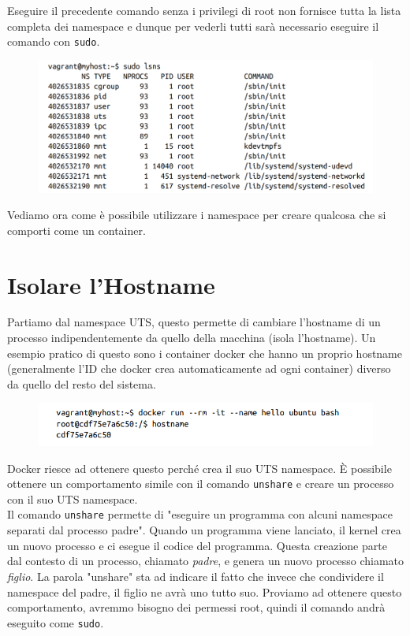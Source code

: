 Eseguire il precedente comando senza i privilegi di root non fornisce tutta la lista
completa dei namespace e dunque per vederli tutti sarà necessario eseguire il comando
con \verb|sudo|.

\begin{figure}[H]
    \centering
    \includegraphics[width=\textwidth, keepaspectratio]{capitoli/os_security/imgs/namespace2.png}
\end{figure}

Vediamo ora come è possibile utilizzare i namespace per creare qualcosa che si
comporti come un container.

\section{Isolare l'Hostname}

Partiamo dal namespace UTS, questo permette di cambiare l'hostname di un processo
indipendentemente da quello della macchina (isola l'hostname).
Un esempio pratico di questo sono i container docker che hanno un proprio hostname
(generalmente l'ID che docker crea automaticamente ad ogni container) diverso da
quello del resto del sistema.

\begin{figure}[H]
    \centering
    \includegraphics[width=\textwidth, keepaspectratio]{capitoli/os_security/imgs/hostname1.png}
\end{figure}

Docker riesce ad ottenere questo perché crea il suo UTS namespace.
È possibile ottenere un comportamento simile con il comando \verb|unshare| e creare
un processo con il suo UTS namespace.\\

Il comando \verb|unshare| permette di "eseguire un programma con alcuni namespace
separati dal processo padre". Quando un programma viene lanciato, il kernel crea un
nuovo processo e ci esegue il codice del programma. Questa creazione parte dal
contesto di un processo, chiamato \textit{padre}, e
genera un nuovo processo chiamato \textit{figlio}. La parola "unshare" sta ad indicare
il fatto che invece che condividere il namespace del padre, il figlio ne avrà uno tutto suo.
Proviamo ad ottenere questo comportamento, avremmo bisogno dei permessi root,
quindi il comando andrà eseguito come \verb|sudo|.

